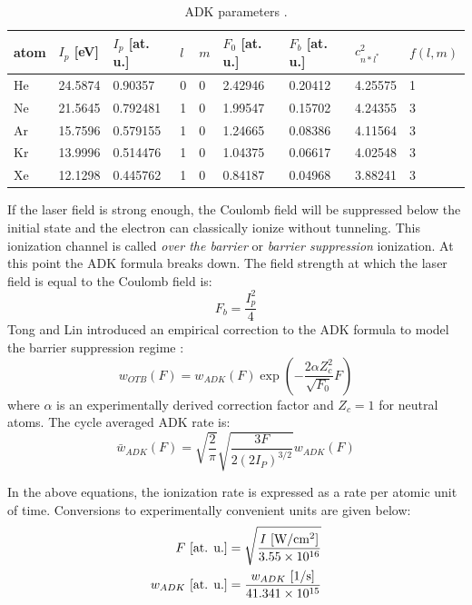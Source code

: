 \begin{table}[]
	\centering
	\begin{tabular}{l|l|l|l|l|l|l|l|l}
		atom & $I_p$ {[}eV{]} & $I_p$ {[}at. u.{]} & $l$ & $m$ & $F_0$ {[}at. u.{]} & $F_b$ {[}at. u.{]} & $c_{n*l^*}^2$ & $f(l,m)$ \\ \hline
		He & 24.5874 & 0.90357 & 0 & 0 & 2.42946 & 0.20412 & 4.25575 & 1 \\
		Ne & 21.5645 & 0.792481 & 1 & 0 & 1.99547 & 0.15702 & 4.24355 & 3 \\
		Ar & 15.7596 & 0.579155 & 1 & 0 & 1.24665 & 0.08386 & 4.11564 & 3 \\
		Kr & 13.9996 & 0.514476 & 1 & 0 & 1.04375 & 0.06617 & 4.02548 & 3 \\
		Xe & 12.1298 & 0.445762 & 1 & 0 & 0.84187 & 0.04968 & 3.88241 & 3
	\end{tabular}
	\caption{ADK parameters \cite{changAttosecondOpticsTechnology2016}.}
	\label{tab:ADK-params}
\end{table}

If the laser field is strong enough, the Coulomb field will be suppressed below the initial state and the electron can classically ionize without tunneling. This ionization channel is called \textit{over the barrier} or \textit{barrier suppression} ionization. At this point the ADK formula breaks down. The field strength at which the laser field is equal to the Coulomb field is:
\begin{equation}
F_b = \frac{I_p^2}{4}
\end{equation}
Tong and Lin introduced an empirical correction to the ADK formula to model the barrier suppression regime \cite{tongEmpiricalFormulaStatic2005}:
\begin{equation}
w_{OTB} (F) = w_{ADK} (F) \exp \left( - \frac{2 \alpha Z_c^2}{\sqrt{F_0}} F \right)
\label{eqn:ADK-TL}
\end{equation}
where $\alpha$ is an experimentally derived correction factor and $Z_c=1$ for neutral atoms. The cycle averaged ADK rate is:
\begin{equation}
\bar{w}_{ADK} (F) = \sqrt{\frac{2}{\pi}} \sqrt{\frac{3 F}{2 (2 I_P)^{3/2}}} w_{ADK} (F)
\end{equation}

In the above equations, the ionization rate is expressed as a rate per atomic unit of time. Conversions to experimentally convenient units are given below:
\begin{align}
F \textrm{ [at. u.]} &= \sqrt{\frac{ I \textrm{ [W/cm\textsuperscript{2}]}}{3.55 \times 10^{16}}} \\
w_{ADK} \textrm{  [at. u.]} &= \frac{w_{ADK} \textrm{ [1/s]}}{41.341 \times 10^{15}}
\end{align}

